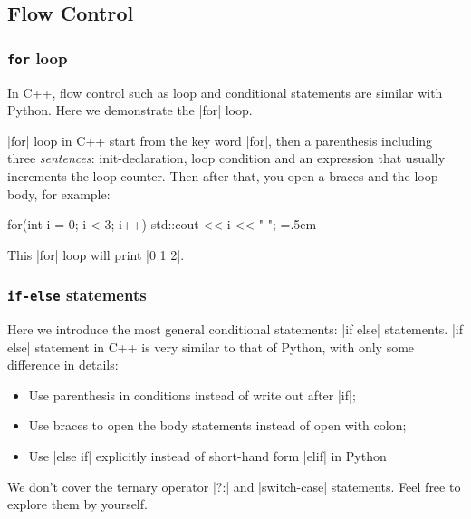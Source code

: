 \documentclass[compress,xcolor={dvipsnames}]{beamer}
\newenvironment{lcverbatim}
 {\SaveVerbatim{cverb}}
 {\endSaveVerbatim
  \flushleft\fboxrule=0pt\fboxsep=.5em
  \colorbox{cverbbg}{%
    \makebox[\dimexpr\linewidth-2\fboxsep][l]{\BUseVerbatim{cverb}}%
  }
  \endflushleft
}
\begin{document}
\subsection{Flow Control}
\begin{frame}[fragile]
    \frametitle{\texttt{for} loop}

    In C++, flow control such as loop and conditional statements are similar with Python. Here we demonstrate the \cverb|for| loop.

    \cverb|for| loop in C++ start from the key word \cverb|for|, then a parenthesis including three \emph{sentences}: init-declaration, loop condition and an expression that usually increments the loop counter. Then after that, you open a braces and the loop body, for example:

    \begin{lcverbatim}
        for(int i = 0; i < 3; i++){
                std::cout << i << " ";
            }
    \end{lcverbatim}

    This \cverb|for| loop will print \cverb|0 1 2|.

\end{frame}

\begin{frame}[fragile]
    \frametitle{\texttt{if-else} statements}

    Here we introduce the most general conditional statements: \cverb|if else| statements. \cverb|if else| statement in C++ is very similar to that of Python, with only some difference in details:
    \begin{itemize}
        \item Use parenthesis in conditions instead of write out after \cverb|if|;
        \item Use braces to open the body statements instead of open with colon;
        \item Use \cverb|else if| explicitly instead of short-hand form \cverb|elif| in Python
    \end{itemize}
    We don't cover the ternary operator \cverb|?:| and \cverb|switch-case| statements. Feel free to explore them by yourself.

\end{frame}
\end{document}
